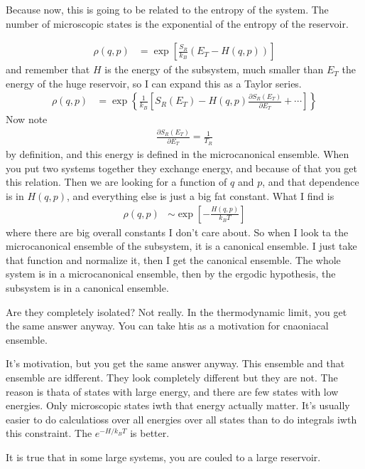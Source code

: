 Because now,
this is going to be related to the entropy of the system.
The number of microscopic states is the exponential of the entropy of the
reservoir.

\begin{align}
    \rho(q, p) &=
    \exp\left[ \frac{S_R}{k_B} \left( E_T - H(q, p) \right) \right]
\end{align}
and remember that $H$ is the energy of the subsystem,
much smaller than $E_T$ the energy of the huge reservoir,
so I can expand this as a Taylor series.
\begin{align}
    \rho(q, p) &=
    \exp\left\{ 
    \frac{1}{k_B}\left[ 
    S_R(E_T) - H(q, p) \frac{\partial S_R(E_T)}{\partial E_T}
    + \cdots
    \right]
    \right\}
\end{align}
Now note
\begin{align}
    \frac{\partial S_R(E_T)}{\partial E_T} = \frac{1}{T_R}
\end{align}
by definition,
and this energy is defined in the microcanonical ensemble.
When you put two systems together they exchange energy,
and because of that you get this relation.
Then we are looking for a function of $q$ and $p$,
and that dependence is in $H(q,p)$,
and everything else is just a big fat constant.
What I find is
\begin{align}
    \rho(q, p) &\sim
    \exp\left[ -\frac{H(q, p)}{k_B T} \right]
\end{align}
where there are big overall constants I don't care about.
So when I look ta the microcanonical ensemble of the subsystem,
it is a canonical ensemble.
I just take that function and normalize it,
then I get the canonical ensemble.
The whole system is in a microcanonical ensemble,
then by the ergodic hypothesis,
the subsystem is in a canonical ensemble.

Are they completely isolated?
Not really.
In the thermodynamic limit,
you get the same answer anyway.
You can take htis as a motivation for cnaoniacal ensemble.

It's motivation,
but you get the same answer anyway.
This ensemble and that ensemble are idfferent.
They look completely different but they are not.
The reason is thata of states with large energy,
and there are few states with low energies.
Only microscopic states iwth that energy actually matter.
It's usually easier to do calculatioss over all energies over all states
than to do integrals iwth this constraint.
The $e^{-H/k_BT}$ is better.

It is true that in some large systems,
you are couled to a large reservoir.

